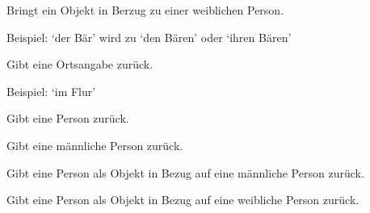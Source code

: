 \documentclass[a4paper,12pt,oneside]{sphinxmanual}
\begin{document}

\begin{fulllineitems}
\label{funktionen:pyzufall.objekt_w}
Bringt ein Objekt in Berzug zu einer weiblichen Person.

Beispiel:
`der Bär' wird zu `den Bären' oder `ihren Bären'

\end{fulllineitems}


\begin{fulllineitems}
\label{funktionen:pyzufall.ort}
Gibt eine Ortsangabe zurück.

Beispiel: `im Flur'

\end{fulllineitems}


\begin{fulllineitems}
\label{funktionen:pyzufall.person}
Gibt eine Person zurück.

\end{fulllineitems}


\begin{fulllineitems}
\label{funktionen:pyzufall.person_m}
Gibt eine männliche Person zurück.

\end{fulllineitems}


\begin{fulllineitems}
\label{funktionen:pyzufall.person_objekt_m}
Gibt eine Person als Objekt in Bezug auf eine männliche Person zurück.

\end{fulllineitems}


\begin{fulllineitems}
\label{funktionen:pyzufall.person_objekt_w}
Gibt eine Person als Objekt in Bezug auf eine weibliche Person zurück.

\end{fulllineitems}
\end{document}
